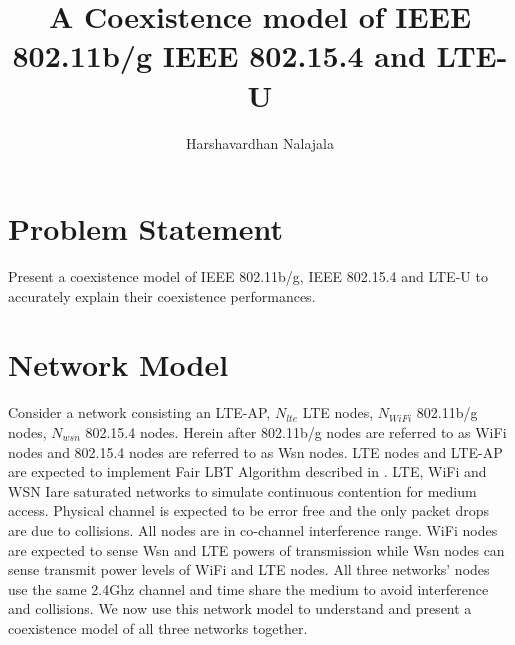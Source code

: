 \documentclass[a4paper]{article}
\begin{document}
	\title{A Coexistence model of {IEEE} 802.11b/g {IEEE} 802.15.4 and {LTE-U}}
	\author{Harshavardhan Nalajala}
	\date{}
	\maketitle
	\tableofcontents
	
	\section{Problem Statement}
	Present a coexistence model of {IEEE} 802.11b/g, {IEEE} 802.15.4 and {LTE-U} to accurately explain their coexistence performances.
	
\section{Network Model}
	Consider a network consisting an {LTE-AP}, $N_{lte}$ {LTE} nodes, $N_{WiFi}$ 802.11b/g nodes, $N_{wsn}$ 802.15.4 nodes. Herein after 802.11b/g nodes are referred to as {WiFi} nodes and 802.15.4 nodes are referred to as {Wsn} nodes. {LTE} nodes and {LTE-AP} are expected to implement Fair LBT Algorithm described in \cite{7419263}. {LTE}, {WiFi} and {WSN} Iare saturated networks to simulate continuous contention for medium access. Physical channel is expected to be error free and the only packet drops are due to collisions. All nodes are in co-channel interference range. {WiFi} nodes are expected to sense {Wsn} and {LTE} powers of transmission while {Wsn} nodes can sense transmit power levels of {WiFi} and {LTE} nodes. All three networks' nodes use the same {2.4Ghz} channel and time share the medium to avoid interference and collisions. We now use this network model to understand and present a coexistence model of all three networks together.
	
\end{document}
